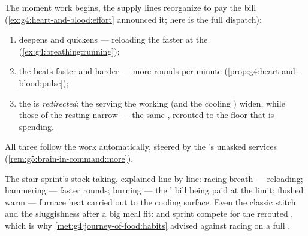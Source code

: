 \begin{proposition}\label{prop:g7:organs-at-work:supply}
The moment work begins, the supply lines reorganize to pay
the bill (\cref{ex:g4:heart-and-blood:effort} announced it;
here is the full dispatch):
\begin{enumerate}
  \item \emph{} deepens and quickens ---
        reloading the  faster at the 
        (\cref{ex:g4:breathing:running});
  \item the \emph{} beats faster and harder --- more
        rounds per minute
        (\cref{prop:g4:heart-and-blood:pulse});
  \item the  is \emph{redirected}: the 
        serving the working  (and the cooling
        ) widen, while those of the resting  narrow --- the same , rerouted to the
        floor that is spending.
\end{enumerate}
All three follow the work automatically, steered by the
's unasked services
(\cref{rem:g5:brain-in-command:more}).
\end{proposition}
\admitted

\begin{example}\label{ex:g7:organs-at-work:felt}
The stair sprint's stock-taking, explained line by line:
racing breath --- reloading; hammering  --- faster
rounds; burning  --- the ' bill being paid at
the limit; flushed warm  --- furnace heat carried out
to the cooling surface. Even the classic stitch and the
sluggishness after a big meal fit:  and sprint
compete for the rerouted , which is why
\cref{met:g4:journey-of-food:habits} advised against
racing on a full .
\end{example}


